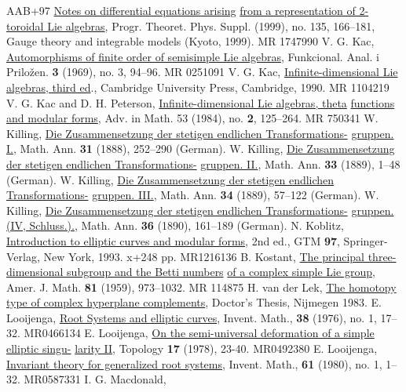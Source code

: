 \documentclass[11pt]{amsart}
\begin{document}
{\begin{thebibliography}{AAB+97}
\underline{Notes on differential equations arising} 
\underline{from a representation of 2-toroidal Lie algebras}, 
Progr. Theoret. Phys. Suppl. (1999), no. 135, 166–181, 
Gauge theory and integrable models (Kyoto, 1999). MR 1747990
V. G. Kac, 
\underline{Automorphisms of finite order of semisimple Lie algebras}, 
Funkcional. Anal. i Prilo\v{z}en. {\bf 3} (1969), no. 3, 94–96. MR 0251091
V. G. Kac, 
\underline{Infinite-dimensional Lie algebras, third ed}., Cambridge University
Press, Cambridge, 1990. MR 1104219
V. G. Kac and D. H. Peterson, 
\underline{Infinite-dimensional Lie algebras, theta} 
\underline{functions and modular forms}, 
Adv. in Math. 53 (1984), no. {\bf 2}, 125–264. MR 750341
W. Killing, 
\underline{Die Zusammensetzung der stetigen endlichen Transformations-}
\underline{gruppen. I.}, Math. Ann. {\bf 31} (1888), 252–290 (German).
W. Killing, 
\underline{Die Zusammensetzung der stetigen endlichen Transformations-}
\underline{gruppen. II.}, Math. Ann. {\bf 33} (1889), 1–48 (German).
W. Killing,
\underline{Die Zusammensetzung der stetigen endlichen Transformations-}
\underline{gruppen. III.}, Math. Ann. {\bf 34} (1889), 57–122 (German).
W. Killing,
\underline{Die Zusammensetzung der stetigen endlichen Transformations-}
\underline{gruppen. (IV, Schluss.).}, Math. Ann. {\bf 36} (1890), 161–189 (German).
N. Koblitz, 
\underline{Introduction to elliptic curves and modular forms}, 2nd ed., 
GTM {\bf 97}, Springer-Verlag, New York, 1993. x+248 pp. MR1216136
B. Kostant,
\underline{The principal three-dimensional subgroup and the Betti numbers}
\underline{of a complex simple Lie group}, Amer. J. Math. {\bf 81} (1959), 973–1032. 
MR 114875
H. van der Lek, 
\underline{The homotopy type of complex hyperplane complements}, 
Doctor's Thesis, Nijmegen 1983.
E. Looijenga, 
\underline{Root Systems and elliptic curves}, 
Invent. Math., {\bf 38} (1976), no. 1, 17–32. MR0466134
E. Looijenga, 
\underline{On the semi-universal deformation of a simple elliptic singu-}
\underline{larity II}, 
Topology {\bf 17} (1978), 23-40. MR0492380
E. Looijenga, 
\underline{Invariant theory for generalized root systems}, 
Invent. Math., {\bf 61} (1980), no. 1, 1–32. MR0587331
I. G. Macdonald, 

\end{thebibliography}}
\end{document}
